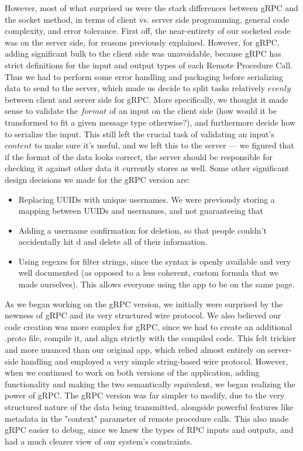 \documentclass[
	a4paper, %
	10pt, %
	unnumberedsections, %
	twoside, %
]{LTJournalArticle}
\begin{document}
However, most of what surprised us were the stark differences between gRPC and the socket method, in terms of client vs. server side programming, general code complexity, and error tolerance. First off, the near-entirety of our socketed code was on the server side, for reasons previously explained. However, for gRPC, adding significant bulk to the client side was unavoidable, because gRPC has strict definitions for the input and output types of each Remote Procedure Call. Thus we had to perform some error handling and packaging before serializing data to send to the server, which made us decide to split tasks relatively $evenly$ between client and server side for gRPC. More specifically, we thought it made sense to validate the $format$ of an input on the client side (how would it be transformed to fit a given message type otherwise?), and furthermore decide how to serialize the input. This still left the crucial task of validating an input's $content$ to make sure it's useful, and we left this to the server --- we figured that if the format of the data looks correct, the server should be responsible for checking it against other data it currently stores as well. Some other significant design decisions we made for the gRPC version are:
\begin{itemize}
    \item Replacing UUIDs with unique usernames. We were previously storing a mapping between UUIDs and usernames, and not guaranteeing that 
    \item Adding a username confirmation for deletion, so that people couldn't accidentally hit d and delete all of their information.
    \item Using regexes for filter strings, since the syntax is openly available and very well documented (as opposed to a less coherent, custom formula that we made ourselves). This allows everyone using the app to be on the same page.
\end{itemize}
As we began working on the gRPC version, we initially were surprised by the newness of gRPC and its very structured wire protocol. We also believed our code creation was more complex for gRPC, since we had to create an additional .proto file, compile it, and align strictly with the compiled code. This felt trickier and more nuanced than our original app, which relied almost entirely on server-side handling and employed a very simple string-based wire protocol. However, when we continued to work on both versions of the application, adding functionality and making the two semantically equivalent, we began realizing the power of gRPC. The gRPC version was far simpler to modify, due to the very structured nature of the data being transmitted, alongside powerful features like metadata in the "context" parameter of remote procedure calls. This also made gRPC easier to debug, since we knew the types of RPC inputs and outputs, and had a much clearer view of our system's constraints.
\end{document}
